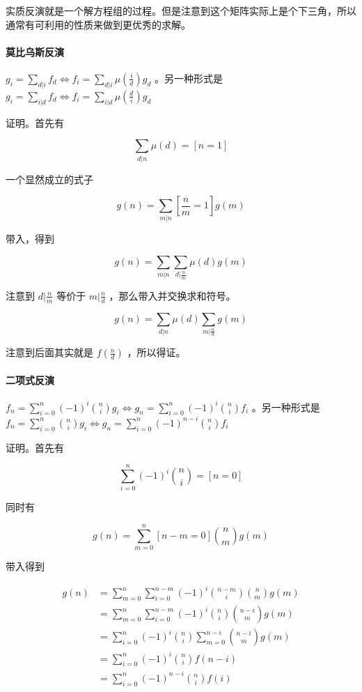 \documentclass[UTF-8]{ctexart}
\begin{document}
			实质反演就是一个解方程组的过程。但是注意到这个矩阵实际上是个下三角，所以通常有可利用的性质来做到更优秀的求解。
			
			\paragraph{莫比乌斯反演} $g_i=\sum_{d|i} f_d \Leftrightarrow f_i=\sum_{d|i} \mu(\frac{i}{d}) g_d$ 。另一种形式是 $g_i=\sum_{i|d} f_d\Leftrightarrow f_i=\sum_{i|d} \mu(\frac{d}{i}) g_d$
			
			证明。首先有
			
			$$\sum_{d|n} \mu(d)=[n=1]$$
			
			一个显然成立的式子
			
			$$g(n)=\sum_{m|n} [\frac{n}{m}=1] g(m)$$
			
			带入，得到
			
			$$g(n)=\sum_{m|n}\sum_{d|\frac{n}{m}} \mu(d) g(m)$$
			
			注意到 $d|\frac{n}{m}$ 等价于 $m|\frac{n}{d}$ ，那么带入并交换求和符号。
			
			$$g(n)=\sum_{d|n}\mu(d)\sum_{m|\frac{n}{d}}g(m)$$
			
			注意到后面其实就是 $f(\frac{n}{d})$ ，所以得证。
			
			\paragraph{二项式反演} $f_n = \sum_{i=0}^n (-1)^i {n \choose i} g_i \Leftrightarrow g_n = \sum_{i=0}^n (-1)^i {n \choose i} f_i$ 。另一种形式是 $f_n = \sum_{i=0}^n {n \choose i} g_i \Leftrightarrow g_n = \sum_{i=0}^n (-1)^{n-i} {n \choose i} f_i$
			
			证明。首先有
			
			$$\sum_{i=0}^n(-1)^i\binom{n}{i}=[n=0]$$
			
			同时有
			
			$$g(n)=\sum_{m=0}^n[n-m=0]\binom{n}{m}g(m)$$
			
			带入得到
			
			\begin{align}
			g(n)&=\sum_{m=0}^n\sum_{i=0}^{n-m}(-1)^i\binom{n-m}{i}\binom{n}{m}g(m)\nonumber\\
			&=\sum_{m=0}^n\sum_{i=0}^{n-m}(-1)^i\binom{n}{i}\binom{n-i}{m}g(m)\nonumber\\
			&=\sum_{i=0}^n(-1)^i\binom{n}{i}\sum_{m=0}^{n-i}\binom{n-i}{m}g(m)\nonumber\\
			&=\sum_{i=0}^n(-1)^i\binom{n}{i}f(n-i)\nonumber\\
			&=\sum_{i=0}^n(-1)^{n-i}\binom{n}{i}f(i)\nonumber
			\end{align}
			
\end{document}
